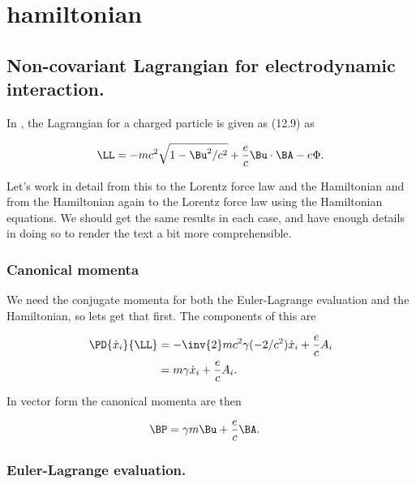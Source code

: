 

\chapter{hamiltonian}
\label{chap:hamiltonian}
{}
\date{Nov 15, 2009}

\beginArtWithToc

\section{Non-covariant Lagrangian for electrodynamic interaction.}

In \cite{jackson1975cew}, the Lagrangian for a charged particle is given as (12.9) as 

\begin{align}\label{eqn:hamiltonian:em1}
\LL = -m c^2 \sqrt{1 - \Bu^2/c^2} + \frac{e}{c} \Bu \cdot \BA - e \Phi.
\end{align}

Let's work in detail from this to the Lorentz force law and the Hamiltonian and from the Hamiltonian again to the Lorentz force law using the Hamiltonian equations.  We should get the same results in each case, and have enough details in doing so to render the text a bit more comprehensible.

\subsection{Canonical momenta}

We need the conjugate momenta for both the Euler-Lagrange evaluation and the Hamiltonian, so lets get that first.  The components of this are

\begin{align*}
\PD{\dot{x}_i}{\LL} 
&= - \inv{2} m c^2 \gamma (-2/c^2) \dot{x}_i + \frac{e}{c} A_i \\
&= m \gamma \dot{x}_i + \frac{e}{c} A_i.
\end{align*}

In vector form the canonical momenta are then

\begin{align}\label{eqn:hamiltonian:em2}
\BP &= \gamma m \Bu + \frac{e}{c} \BA.
\end{align}

\subsection{Euler-Lagrange evaluation.}

